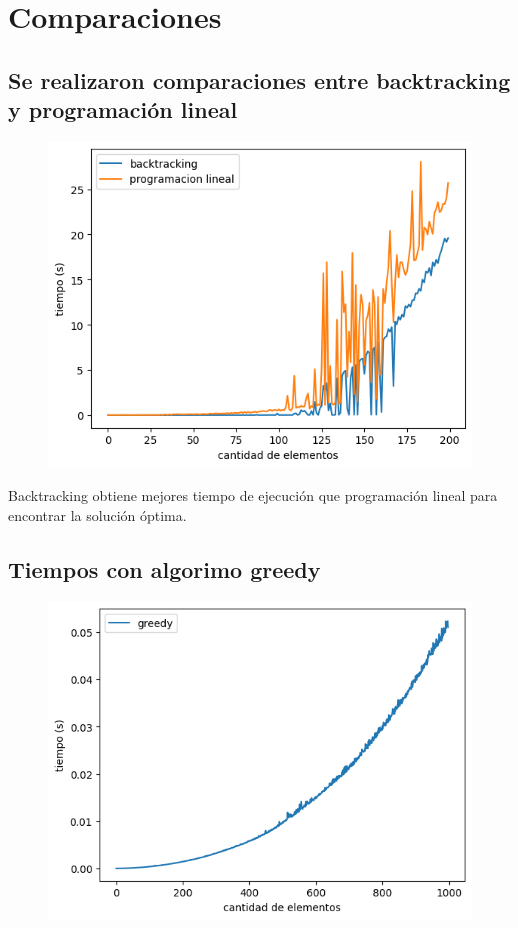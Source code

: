 \section{Comparaciones}

\subsection{Se realizaron comparaciones entre backtracking y programación lineal}

\begin{figure}[H]
    \centering
    \includegraphics[width=1\textwidth]{img/backvslp.png}
\end{figure}

Backtracking obtiene mejores tiempo de ejecución que programación lineal para encontrar la solución óptima.

\subsection{Tiempos con algorimo greedy}

\begin{figure}[H]
    \centering
    \includegraphics[width=1\textwidth]{img/greedy.png}
\end{figure}

